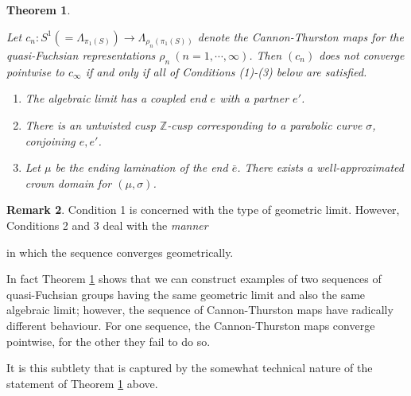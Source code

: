 \documentclass{amsart}
\newtheorem{theorem}{Theorem}[section]
\theoremstyle{definition}
\newtheorem{rmk}[theorem]{Remark}
\newcommand{\integers}{\mathbb{Z}}
\newcommand\HHH{{\mathbb H}}
\begin{document}
\begin{theorem}
	\label{introthm1}{\rm
	Let $c_n : S^1 (=\Lambda_{\pi_1(S)}) \rightarrow \Lambda_{\rho_n(\pi_1(S))}$ denote
 the Cannon-Thurston maps  for the quasi-Fuchsian representations $\rho_n\ (n= 1, \cdots, \infty)$. Then $(c_n)$ does not converge pointwise to   $c_\infty$ if and only if all of Conditions (1)-(3) below are satisfied.
 
 \begin{enumerate}
 	\item The algebraic limit has a   coupled end $e$ with a partner $e'$.
 	
 	
 	\item
	There is an untwisted cusp $\integers$-cusp corresponding to a parabolic curve $\sigma$, conjoining $e, e'$. 
 	
 	\item Let $\mu$ be the ending lamination of the end $\bar e$. There exists a well-approximated crown domain for $(\mu, \sigma)$.
 \end{enumerate}}
\end{theorem}

\begin{rmk}{\rm
Condition 1 is concerned with the type of geometric limit.  However, Conditions 2 and 3 deal with the} {\it manner} {\rm in which the sequence converges geometrically.

In fact Theorem \ref{introthm1} shows that we  can construct examples of two sequences of quasi-Fuchsian groups having the same geometric limit and also the same algebraic limit; however, the sequence of  Cannon-Thurston maps have radically different behaviour. For one sequence, the Cannon-Thurston maps converge pointwise, for the other they fail to do so.

It is this subtlety that is captured by the somewhat technical nature of the statement of Theorem \ref{introthm1} above.}
\end{rmk}
\end{document}
